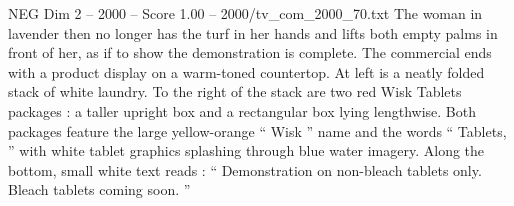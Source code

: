 \begin{textsample}{NEG Dim 2 – 2000 – Score 1.00 – 2000/tv\_com\_2000\_70.txt}
The woman in lavender then no longer has the turf in her hands and lifts both empty palms in front of her, as if to show the demonstration is complete.
The commercial ends with a product display on a warm-toned countertop.
At left is a neatly folded stack of white laundry.
To the right of the stack are two red Wisk Tablets packages : a taller upright box and a rectangular box lying lengthwise.
Both packages feature the large yellow-orange “ Wisk ” name and the words “ Tablets, ” with white tablet graphics splashing through blue water imagery.
Along the bottom, small white text reads : “ Demonstration on non-bleach tablets only.
Bleach tablets coming soon. ”

\end{textsample}
